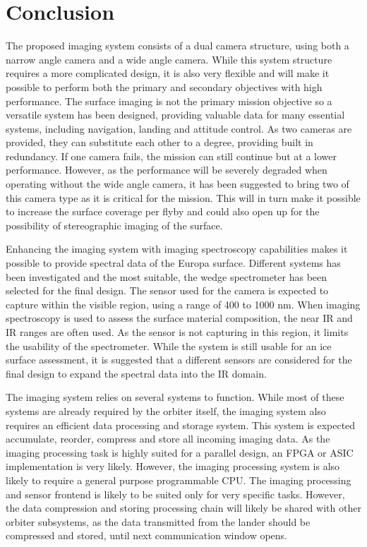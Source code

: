 \section{Conclusion}
The proposed imaging system consists of a dual camera structure, using both a narrow angle camera and a wide angle camera. While this system structure requires a more complicated design, it is also very flexible and will make it possible to perform both the primary and secondary objectives with high performance. The surface imaging is not the primary mission objective so a versatile system has been designed, providing valuable data for many essential systems, including navigation, landing and attitude control. As two cameras are provided, they can substitute each other to a degree, providing built in redundancy. If one camera fails, the mission can still continue but at a lower performance. However, as the performance will be severely degraded when operating without the wide angle camera, it has been suggested to bring two of this camera type as it is critical for the mission. This will in turn make it possible to increase the surface coverage per flyby and could also open up for the possibility of stereographic imaging of the surface.

Enhancing the imaging system with imaging spectroscopy capabilities makes it possible to provide spectral data of the Europa surface. Different systems has been investigated and the most suitable, the wedge spectrometer has been selected for the final design. The sensor used for the camera is expected to capture within the visible region, using a range of 400 to 1000 nm. When imaging spectroscopy is used to assess the surface material composition, the near IR and IR ranges are often used. As the sensor is not capturing in this region, it limits the usability of the spectrometer. While the system is still usable for an ice surface assessment, it is suggested that a different sensors are considered for the final design to expand the spectral data into the IR domain.

The imaging system relies on several systems to function. While most of these systems are already required by the orbiter itself, the imaging system also requires an efficient data processing and storage system. This system is expected accumulate, reorder, compress and store all incoming imaging data. As the imaging processing task is highly suited for a parallel design, an FPGA or ASIC implementation is very likely. However, the imaging processing system is also likely to require a general purpose programmable CPU. The imaging processing and sensor frontend is likely to be suited only for very specific tasks. However, the data compression and storing processing chain will likely be shared with other orbiter subsystems, as the data transmitted from the lander should be compressed and stored, until next communication window opens.


